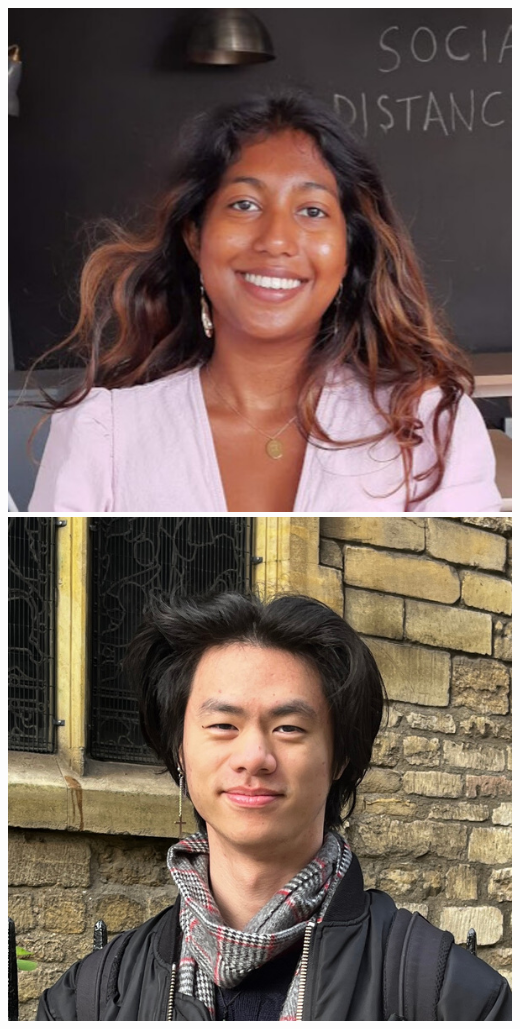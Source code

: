 \documentclass[aspectratio=169]{beamer}
\begin{document}
\begin{frame}
{        \includegraphics[width=0.09\textheight]{people/metha_prathaban.jpg}%
        \includegraphics[width=0.09\textheight]{people/ming_yang.jpg}%
}
\end{frame}
\end{document}
